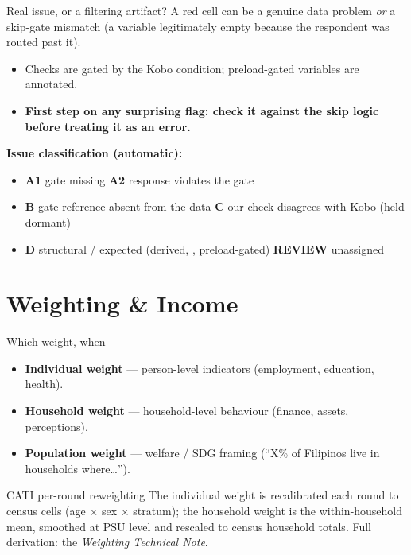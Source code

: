\documentclass[aspectratio=169,11pt]{beamer}
\newcommand{\code}[1]{{\ttfamily\small\detokenize{#1}}}
\begin{document}
\begin{frame}{Real issue, or a filtering artifact?}
  A red cell can be a genuine data problem \emph{or} a skip-gate mismatch (a variable legitimately empty because the respondent was routed past it).
  \vspace{0.4em}
  \begin{itemize}\small
    \item Checks are gated by the Kobo \code{relevant} condition; preload-gated variables are annotated.
    \item \textbf{First step on any surprising flag: check it against the skip logic before treating it as an error.}
  \end{itemize}
  \vspace{0.3em}
  \textbf{Issue classification (automatic):}
  \begin{itemize}\small
    \item \textbf{A1} gate missing \quad \textbf{A2} response violates the gate
    \item \textbf{B} gate reference absent from the data \quad \textbf{C} our check disagrees with Kobo (held dormant)
    \item \textbf{D} structural / expected (derived, \code{_oth}, preload-gated) \quad \textbf{REVIEW} unassigned
  \end{itemize}
\end{frame}

\section{Weighting \& Income}

\begin{frame}{Which weight, when}
  \begin{itemize}
    \item \textbf{Individual weight} --- person-level indicators (employment, education, health).
    \item \textbf{Household weight} --- household-level behaviour (finance, assets, perceptions).
    \item \textbf{Population weight} --- welfare / SDG framing (``X\% of Filipinos live in households where\ldots'').
  \end{itemize}
  \vfill
  \begin{block}{CATI per-round reweighting}
  The individual weight is recalibrated each round to census cells (age $\times$ sex $\times$ stratum); the household weight is the within-household mean, smoothed at PSU level and rescaled to census household totals. Full derivation: the \textit{Weighting Technical Note}.
  \end{block}
\end{frame}
\end{document}
